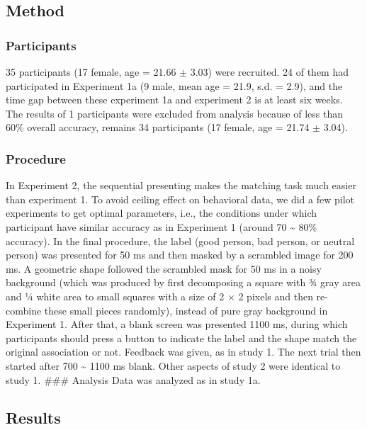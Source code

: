 \documentclass[man]{apa6}
\begin{document}
\hypertarget{method-2}{%
\subsection{Method}\label{method-2}}

\hypertarget{participants-3}{%
\subsubsection{Participants}\label{participants-3}}

35 participants (17 female, age = 21.66 \(\pm\) 3.03) were recruited. 24 of them had participated in Experiment 1a (9 male, mean age = 21.9, s.d. = 2.9), and the time gap between these experiment 1a and experiment 2 is at least six weeks. The results of 1 participants were excluded from analysis because of less than 60\% overall accuracy, remains 34 participants (17 female, age = 21.74 \(\pm\) 3.04).

\hypertarget{procedure-3}{%
\subsubsection{Procedure}\label{procedure-3}}

In Experiment 2, the sequential presenting makes the matching task much easier than experiment 1. To avoid ceiling effect on behavioral data, we did a few pilot experiments to get optimal parameters, i.e., the conditions under which participant have similar accuracy as in Experiment 1 (around 70 \textasciitilde{} 80\% accuracy).
In the final procedure, the label (good person, bad person, or neutral person) was presented for 50 ms and then masked by a scrambled image for 200 ms. A geometric shape followed the scrambled mask for 50 ms in a noisy background (which was produced by first decomposing a square with ¾ gray area and ¼ white area to small squares with a size of 2 × 2 pixels and then re-combine these small pieces randomly), instead of pure gray background in Experiment 1. After that, a blank screen was presented 1100 ms, during which participants should press a button to indicate the label and the shape match the original association or not. Feedback was given, as in study 1. The next trial then started after 700 \textasciitilde{} 1100 ms blank. Other aspects of study 2 were identical to study 1.
\#\#\# Analysis
Data was analyzed as in study 1a.

\hypertarget{results-3}{%
\subsection{Results}\label{results-3}}
\end{document}
